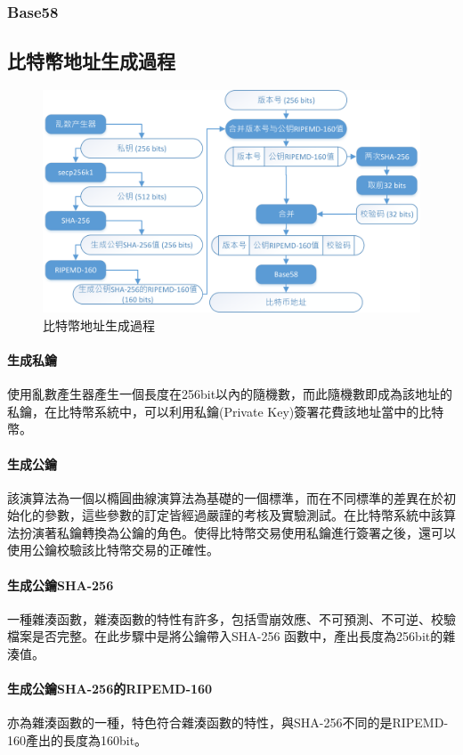 			\subsubsection{Base58}

		\subsection{比特幣地址生成過程}

			\begin{figure}[h]
				\centering
				\includegraphics[width = .9\textwidth]{address.png}
				\caption{比特幣地址生成過程}\label{address}
			\end{figure}

			\paragraph{生成私鑰}使用亂數產生器產生一個長度在256bit以內的隨機數，而此隨機數即成為該地址的私鑰，在比特幣系統中，可以利用私鑰(Private Key)簽署花費該地址當中的比特幣。
			\paragraph{生成公鑰}該演算法為一個以橢圓曲線演算法為基礎的一個標準，而在不同標準的差異在於初始化的參數，這些參數的訂定皆經過嚴謹的考核及實驗測試。在比特幣系統中該算法扮演著私鑰轉換為公鑰的角色。使得比特幣交易使用私鑰進行簽署之後，還可以使用公鑰校驗該比特幣交易的正確性。
			\paragraph{生成公鑰SHA-256}一種雜湊函數，雜湊函數的特性有許多，包括雪崩效應、不可預測、不可逆、校驗檔案是否完整。在此步驟中是將公鑰帶入SHA-256 函數中，產出長度為256bit的雜湊值。
			\paragraph{生成公鑰SHA-256的RIPEMD-160}亦為雜湊函數的一種，特色符合雜湊函數的特性，與SHA-256不同的是RIPEMD-160產出的長度為160bit。
